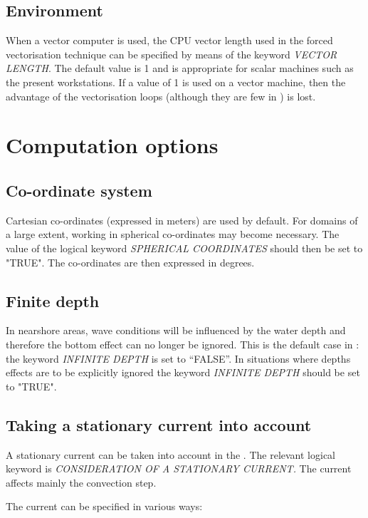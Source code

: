 \subsection{ Environment}

 When a vector computer is used, the CPU vector length used in the forced vectorisation technique can be specified by means of the keyword \textit{VECTOR LENGTH}. The default value is 1 and is appropriate for scalar machines such as the present workstations. If a value of 1 is used on a vector machine, then the advantage of the vectorisation loops (although they are few in \tomawac) is lost.


\section{ Computation options}


\subsection{ Co-ordinate system}

 Cartesian co-ordinates (expressed in meters) are used by default. For domains of a large extent, working in spherical co-ordinates may become necessary. The value of the logical keyword \textit{SPHERICAL COORDINATES} should then be set to "TRUE". The co-ordinates are then expressed in degrees.


\subsection{ Finite depth }

 In nearshore areas, wave conditions will be influenced by the water depth and therefore the bottom effect can no longer be ignored. This is the default case in \tomawac: the keyword \textit{INFINITE DEPTH }is set to ``FALSE''. In situations where depths effects are to be explicitly ignored the keyword \textit{INFINITE DEPTH} should be set to "TRUE".


\subsection{ Taking a stationary current into account}
\label{se:current}
 A stationary current can be taken into account in the \tomawac. The relevant logical keyword is \textit{CONSIDERATION OF A STATIONARY CURRENT. }The current affects mainly the convection step.

 The current can be specified in various ways:

